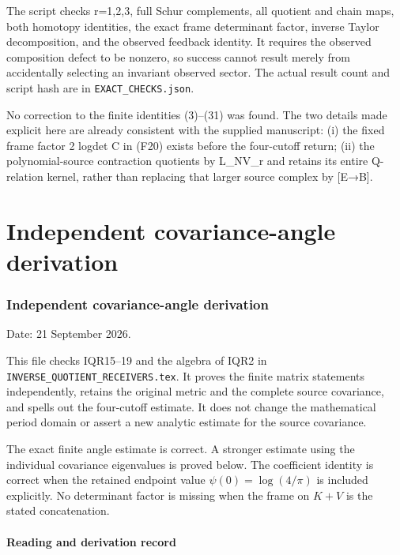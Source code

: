 \documentclass[11pt]{article}
\begin{document}
The script checks r=1,2,3, full Schur complements, all quotient and chain maps, both homotopy identities, the exact frame determinant factor, inverse Taylor decomposition, and the observed feedback identity. It requires the observed composition defect to be nonzero, so success cannot result merely from accidentally selecting an invariant observed sector. The actual result count and script hash are in \nolinkurl{EXACT_CHECKS.json}.

No correction to the finite identities (3)--(31) was found. The two details made explicit here are already consistent with the supplied manuscript: (i) the fixed frame factor 2 log\textbar det C\textbar{} in (F20) exists before the four-cutoff return; (ii) the polynomial-source contraction quotients by L\_NV\_r and retains its entire Q-relation kernel, rather than replacing that larger source complex by {[}E→B{]}.

\clearpage\part{Independent covariance-angle derivation}
\section{Independent covariance-angle derivation}\label{independent-covariance-angle-derivation}

Date: 21 September 2026.

This file checks IQR15--19 and the algebra of IQR2 in \nolinkurl{INVERSE_QUOTIENT_RECEIVERS.tex}. It proves the finite matrix statements independently, retains the original metric and the complete source covariance, and spells out the four-cutoff estimate. It does not change the mathematical period domain or assert a new analytic estimate for the source covariance.

The exact finite angle estimate is correct. A stronger estimate using the individual covariance eigenvalues is proved below. The coefficient identity is correct when the retained endpoint value \(\psi(0)=\log(4/\pi)\) is included explicitly. No determinant factor is missing when the frame on \(K+V\) is the stated concatenation.

\subsection{Reading and derivation record}\label{reading-and-derivation-record}
\end{document}
